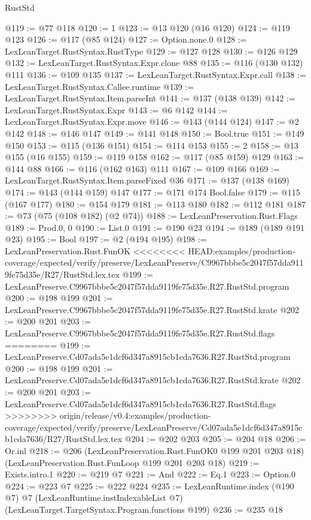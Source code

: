 \begin{lexlean}{RustStd}
\begin{coremodule}
{\begin{coremodule}
{{{{{@119 := @77 @118
@120 := 1
@123 := @13 @120 (@16 @120)
@124 := @119 @123
@126 := @117 (@85 @124)
@127 := Option.none.{0}
@128 := LexLeanTarget.RustSyntax.RustType
@129 := @127 @128
@130 := @126 @129
@132 := LexLeanTarget.RustSyntax.Expr.clone @88
@135 := @116 (@130 @132) @111
@136 := @109 @135
@137 := LexLeanTarget.RustSyntax.Expr.call
@138 := LexLeanTarget.RustSyntax.Callee.runtime
@139 := LexLeanTarget.RustSyntax.Item.parseInt
@141 := @137 (@138 @139)
@142 := LexLeanTarget.RustSyntax.Expr
@143 := @6 @142
@144 := LexLeanTarget.RustSyntax.Expr.move
@146 := @143 (@144 @124)
@147 := @2 @142
@148 := @146 @147
@149 := @141 @148
@150 := Bool.true
@151 := @149 @150
@153 := @115 (@136 @151)
@154 := @114 @153
@155 := 2
@158 := @13 @155 (@16 @155)
@159 := @119 @158
@162 := @117 (@85 @159) @129
@163 := @144 @88
@166 := @116 (@162 @163) @111
@167 := @109 @166
@169 := LexLeanTarget.RustSyntax.Item.parseFixed @36
@171 := @137 (@138 @169)
@174 := @143 (@144 @159) @147
@177 := @171 @174 Bool.false
@179 := @115 (@167 @177)
@180 := @154 @179
@181 := @113 @180
@182 := @112 @181
@187 := @73 (@75 (@108 @182) (@2 @74))
@188 := LexLeanPreservation.Rust.Flags
@189 := Prod.{0, 0}
@190 := List.{0}
@191 := @190 @23
@194 := @189 (@189 @191 @23)
@195 := Bool
@197 := @2 (@194 @195)
@198 := LexLeanPreservation.Rust.FunOK
<<<<<<<< HEAD:examples/production-coverage/expected/verify/preserve/LexLeanPreserve/C9967bbbe5c2047f57dda9119fe75d35e/R27/RustStd.lex.tex
@199 := LexLeanPreserve.C9967bbbe5c2047f57dda9119fe75d35e.R27.RustStd.program
@200 := @198 @199
@201 := LexLeanPreserve.C9967bbbe5c2047f57dda9119fe75d35e.R27.RustStd.krate
@202 := @200 @201
@203 := LexLeanPreserve.C9967bbbe5c2047f57dda9119fe75d35e.R27.RustStd.flags
========
@199 := LexLeanPreserve.Cd07ada5e1dcf6d347a8915cb1cda7636.R27.RustStd.program
@200 := @198 @199
@201 := LexLeanPreserve.Cd07ada5e1dcf6d347a8915cb1cda7636.R27.RustStd.krate
@202 := @200 @201
@203 := LexLeanPreserve.Cd07ada5e1dcf6d347a8915cb1cda7636.R27.RustStd.flags
>>>>>>>> origin/release/v0.4:examples/production-coverage/expected/verify/preserve/LexLeanPreserve/Cd07ada5e1dcf6d347a8915cb1cda7636/R27/RustStd.lex.tex
@204 := @202 @203
@205 := @204 @18
@206 := Or.inl
@218 := @206
    (LexLeanPreservation.Rust.FunOK0 @199 @201 @203 @18)
    (LexLeanPreservation.Rust.FunLoop @199 @201 @203 @18)
@219 := Exists.intro.{1}
@220 := @219 @7
@221 := And
@222 := Eq.{1}
@223 := Option.{0}
@224 := @223 @7
@225 := @222 @224
@235 := LexLeanRuntime.index
    (@190 @7)
    @7
    (LexLeanRuntime.instIndexableList @7)
    (LexLeanTarget.TargetSyntax.Program.functions @199)
@236 := @235 @18
}}}}}
\end{coremodule}}
\end{coremodule}
\end{lexlean}
